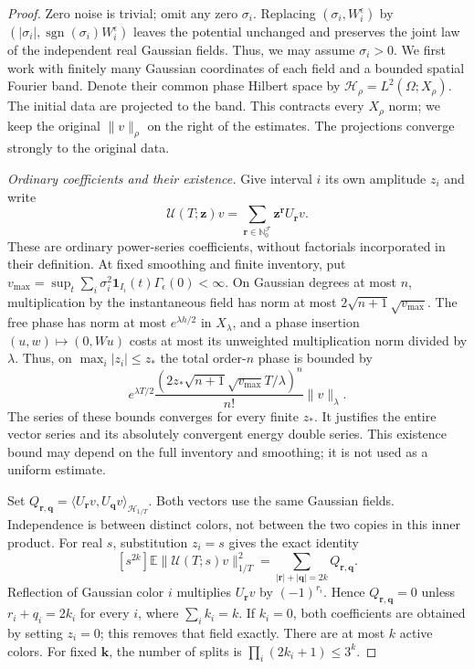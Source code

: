 \documentclass[12pt]{article}
\numberwithin{equation}{section}
\theoremstyle{definition}
\newcommand{\N}{\mathbb{N}}
\newcommand{\E}{\mathbb{E}}
\begin{document}
\begin{proof}
  Zero noise is trivial; omit any zero $\sigma_i$.
  Replacing $(\sigma_i,W_i^\epsilon)$ by
  $(|\sigma_i|,\operatorname{sgn}(\sigma_i)W_i^\epsilon)$ leaves the
  potential unchanged and preserves the joint law of the independent
  real Gaussian fields. Thus, we may assume $\sigma_i>0$.
  We first work with finitely many Gaussian coordinates of each field and
  a bounded spatial Fourier band. Denote their common phase Hilbert space
  by $\mathcal H_\rho=L^2(\Omega;X_\rho)$.
  The initial data are projected to the band. This contracts every
  $X_\rho$ norm; we keep the original $\|v\|_\rho$ on the right of
  the estimates. The projections converge strongly to the original data.

  \emph{Ordinary coefficients and their existence.}
  Give interval $i$ its own amplitude $z_i$ and write
  \[
    \mathcal U(T;\boldsymbol z)v
    =\sum_{\boldsymbol r\in\N_0^{\mathcal F}}
    \boldsymbol z^{\boldsymbol r}U_{\boldsymbol r}v.
  \]
  These are ordinary power-series coefficients, without factorials
  incorporated in their definition. At fixed smoothing and finite inventory,
  put $v_{\max}=\sup_t\sum_i\sigma_i^2\mathbf1_{I_i}(t)
  \Gamma_\epsilon(0)<\infty$.
  On Gaussian degrees at most $n$, multiplication by the instantaneous
  field has norm at most $2\sqrt{n+1}\sqrt{v_{\max}}$.
  The free phase has norm at most $e^{\lambda h/2}$ in $X_\lambda$,
  and a phase insertion $(u,w)\mapsto(0,Wu)$ costs at most its
  unweighted multiplication norm divided by $\lambda$.
  Thus, on $\max_i|z_i|\le z_*$ the total order-$n$ phase is bounded by
  \begin{equation}\label{E:interval-entire-majorant}
    e^{\lambda T/2}
    \frac{(2z_*\sqrt{n+1}\sqrt{v_{\max}}T/\lambda)^n}{n!}
    \|v\|_\lambda .
  \end{equation}
  The series of these bounds converges for every finite $z_*$.
  It justifies the entire vector series and its absolutely convergent
  energy double series. This existence bound may depend on the full
  inventory and smoothing; it is not used as a uniform estimate.

  Set
  $Q_{\boldsymbol r,\boldsymbol q}
  =\langle U_{\boldsymbol r}v,U_{\boldsymbol q}v
  \rangle_{\mathcal H_{1/T}}$.
  Both vectors use the same Gaussian fields. Independence is between
  distinct colors, not between the two copies in this inner product.
  For real $s$, substitution $z_i=s$ gives the exact identity
  \begin{equation}\label{E:interval-energy-splits}
    [s^{2k}]\E\|\mathcal U(T;s)v\|_{1/T}^2
    =\sum_{|\boldsymbol r|+|\boldsymbol q|=2k}
    Q_{\boldsymbol r,\boldsymbol q}.
  \end{equation}
  Reflection of Gaussian color $i$ multiplies $U_{\boldsymbol r}v$
  by $(-1)^{r_i}$. Hence $Q_{\boldsymbol r,\boldsymbol q}=0$ unless
  $r_i+q_i=2k_i$ for every $i$, where $\sum_i k_i=k$.
  If $k_i=0$, both coefficients are obtained by setting $z_i=0$;
  this removes that field exactly. There are at most $k$ active colors.
  For fixed $\boldsymbol k$, the number of splits is
  $\prod_i(2k_i+1)\le3^k$.


\end{proof}
\end{document}
